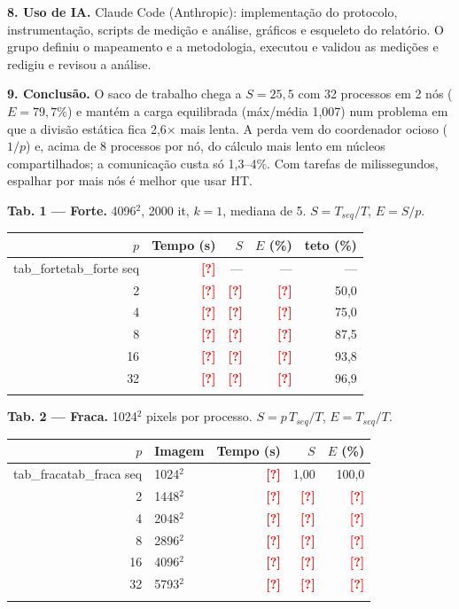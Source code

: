 \documentclass[10pt,a4paper,twocolumn]{article}
\newcommand{\pend}[1]{\textcolor{red}{\textbf{[#1]}}}
\newcommand{\linhas}[2]{\ifcsname #1\endcsname\csname #1\endcsname\else #2\fi}
\begin{document}
\textbf{8. Uso de IA.}
Claude Code (Anthropic): implementação do protocolo, instrumentação, scripts
de medição e análise, gráficos e esqueleto do relatório. O grupo definiu o
mapeamento e a metodologia, executou e validou as medições e redigiu e
revisou a análise.

\textbf{9. Conclusão.}
O saco de trabalho chega a $S=25{,}5$ com 32 processos em 2 nós
($E=79{,}7\%$) e mantém a carga equilibrada (máx/média 1,007) num problema em
que a divisão estática fica 2,6$\times$ mais lenta. A perda vem do
coordenador ocioso ($1/p$) e, acima de 8 processos por nó, do cálculo mais
lento em núcleos compartilhados; a comunicação custa só 1,3--4\%. Com tarefas
de milissegundos, espalhar por mais nós é melhor que usar HT.

\onecolumn
\newpage
\small

\begin{minipage}[t]{0.49\linewidth}
\textbf{Tab. 1 --- Forte.} 4096$^2$, 2000 it, $k=1$, mediana de 5.
$S=T_{seq}/T$, $E=S/p$.\\[2pt]
\begin{tabular}{rrrrr}
\toprule
$p$ & Tempo (s) & $S$ & $E$ (\%) & teto (\%) \\
\midrule
\linhas{tab_forte}{%
seq & \pend{?} & --- & --- & --- \\
2  & \pend{?} & \pend{?} & \pend{?} & 50,0 \\
4  & \pend{?} & \pend{?} & \pend{?} & 75,0 \\
8  & \pend{?} & \pend{?} & \pend{?} & 87,5 \\
16 & \pend{?} & \pend{?} & \pend{?} & 93,8 \\
32 & \pend{?} & \pend{?} & \pend{?} & 96,9 \\}
\bottomrule
\end{tabular}
\end{minipage}\hfill
\begin{minipage}[t]{0.49\linewidth}
\textbf{Tab. 2 --- Fraca.} 1024$^2$ pixels por processo.
$S=p\,T_{seq}/T$, $E=T_{seq}/T$.\\[2pt]
\begin{tabular}{rlrrr}
\toprule
$p$ & Imagem & Tempo (s) & $S$ & $E$ (\%) \\
\midrule
\linhas{tab_fraca}{%
seq & 1024$^2$ & \pend{?} & 1,00 & 100,0 \\
2  & 1448$^2$ & \pend{?} & \pend{?} & \pend{?} \\
4  & 2048$^2$ & \pend{?} & \pend{?} & \pend{?} \\
8  & 2896$^2$ & \pend{?} & \pend{?} & \pend{?} \\
16 & 4096$^2$ & \pend{?} & \pend{?} & \pend{?} \\
32 & 5793$^2$ & \pend{?} & \pend{?} & \pend{?} \\}
\bottomrule
\end{tabular}
\end{minipage}
\end{document}
